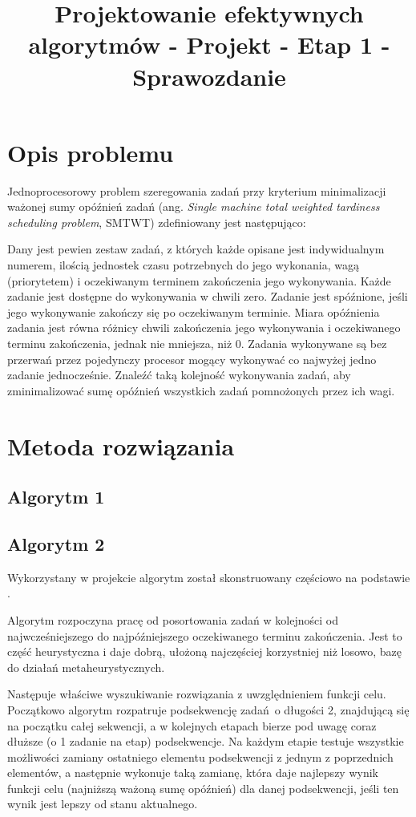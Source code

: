 \documentclass[polish,polish,a4paper]{article}
\title{Projektowanie efektywnych algorytmów - Projekt - Etap 1 - Sprawozdanie}
\begin{document}

\newpage


\section{Opis problemu}
	
	Jednoprocesorowy problem szeregowania zadań przy kryterium minimalizacji ważonej sumy opóźnień zadań (ang. \textit{Single machine total weighted tardiness scheduling problem}, SMTWT) zdefiniowany jest następująco:
	
	Dany jest pewien zestaw zadań, z których każde opisane jest indywidualnym numerem, ilością jednostek czasu potrzebnych do jego wykonania, wagą (priorytetem) i oczekiwanym terminem zakończenia jego wykonywania. Każde zadanie jest dostępne do wykonywania w chwili zero. Zadanie jest spóźnione, jeśli jego wykonywanie zakończy się po oczekiwanym terminie. Miara opóźnienia zadania jest równa różnicy chwili zakończenia jego wykonywania i oczekiwanego terminu zakończenia, jednak nie mniejsza, niż 0. Zadania wykonywane są bez przerwań przez pojedynczy procesor mogący wykonywać co najwyżej jedno zadanie jednocześnie. Znaleźć taką kolejność wykonywania zadań, aby zminimalizować sumę opóźnień wszystkich zadań pomnożonych przez ich wagi.
	
	
\section{Metoda rozwiązania}
	\subsection{Algorytm 1}
	
	\subsection{Algorytm 2}
	
	Wykorzystany w projekcie algorytm został skonstruowany częściowo na podstawie \cite{Dynasearch}.
	
	Algorytm rozpoczyna pracę od posortowania zadań w kolejności od najwcześniejszego do najpóźniejszego oczekiwanego terminu zakończenia. Jest to część heurystyczna i daje dobrą, ułożoną najczęściej korzystniej niż losowo, bazę do działań metaheurystycznych.
	
	Następuje właściwe wyszukiwanie rozwiązania z uwzględnieniem funkcji celu. Początkowo algorytm rozpatruje podsekwencję zadań o długości 2, znajdującą się na początku całej sekwencji, a w kolejnych etapach bierze pod uwagę coraz dłuższe (o 1 zadanie na etap) podsekwencje. Na każdym etapie testuje wszystkie możliwości zamiany ostatniego elementu podsekwencji z jednym z poprzednich elementów, a następnie wykonuje taką zamianę, która daje najlepszy wynik funkcji celu (najniższą ważoną sumę opóźnień) dla danej podsekwencji, jeśli ten wynik jest lepszy od stanu aktualnego.
	
\end{document}
